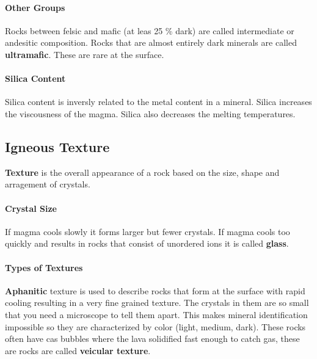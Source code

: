 \documentclass{article}
\begin{document}
\paragraph{Other Groups} %
\label{par:other_groups}
Rocks between felsic and mafic (at leas 25 \% dark) are called intermediate or andesitic composition. Rocks that are almost entirely dark minerals are called \textbf{ultramafic}. These are rare at the surface.

\paragraph{Silica Content} %
\label{par:silica_content}
Silica content is inversly related to the metal content in a mineral. Silica increases the viscousness of the magma. Silica also decreases the melting temperatures.


\subsection*{Igneous Texture} %
\label{sub:igneous_texture}
\textbf{Texture} is the overall appearance of a rock based on the size, shape and arragement of crystals.

\paragraph{Crystal Size} %
\label{par:crystal_size}
If magma cools slowly it forms larger but fewer crystals. If magma cools too quickly and results in rocks that consist of unordered ions it is called \textbf{glass}.

\paragraph{Types of Textures} %
\label{par:types_of_textures}


\textbf{Aphanitic} texture is used to describe rocks that form at the surface with rapid cooling resulting in a very fine grained texture. The crystals in them are so small that you need a microscope to tell them apart. This makes mineral identification impossible so they are characterized by color (light, medium, dark). These rocks often have cas bubbles where the lava solidified fast enough to catch gas, these are rocks are called \textbf{veicular texture}.
\end{document}
